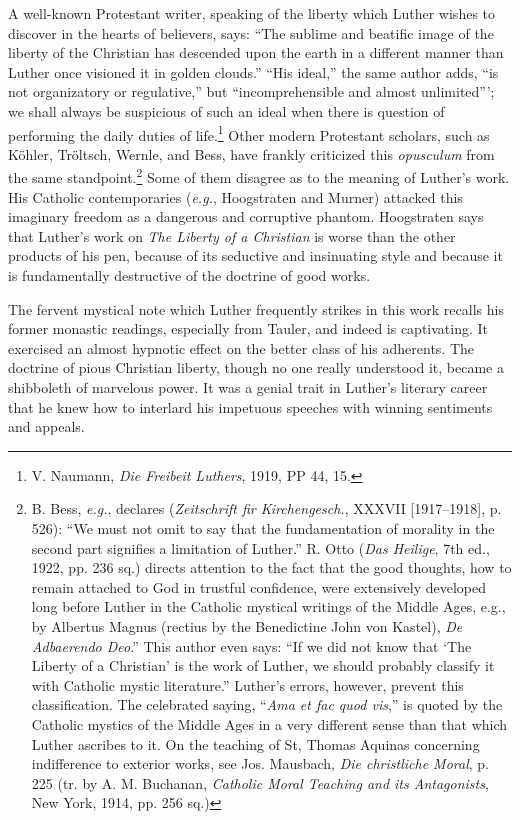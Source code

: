 A well-known Protestant writer, speaking of the liberty which
Luther wishes to discover in the hearts of believers, says: “The sublime
and beatific image of the liberty of the Christian has descended
upon the earth in a different manner than Luther once visioned it in
golden clouds.” “His ideal,” the same author adds, “is not organizatory
or regulative,” but “incomprehensible and almost unlimited”’;
we shall always be suspicious of such an ideal when there is question of
performing the daily duties of life.\footnote
{V. Naumann, \textit{Die Freibeit Luthers}, 1919, PP 44, 15.}
Other modern Protestant
scholars, such as Köhler, Tröltsch, Wernle, and Bess, have frankly
criticized this \textit{opusculum} from the same standpoint.\footnote
{B. Bess, \textit{e.g.}, declares (\textit{Zeitschrift fir Kirchengesch.}, XXXVII [1917--1918], p. 526):
“We must not omit to say that the fundamentation of morality in the second part signifies
a limitation of Luther.” R. Otto (\textit{Das Heilige}, 7th ed., 1922, pp. 236 sq.) directs
attention to the fact that the good thoughts, how to remain attached to God in trustful
confidence, were extensively developed long before Luther in the Catholic mystical writings
of the Middle Ages, e.g., by Albertus Magnus (rectius by the Benedictine John von Kastel),
\textit{De Adbaerendo Deo}.” This author even says: “If we did not know that ‘The Liberty of a
Christian’ is the work of Luther, we should probably classify it with Catholic mystic
literature.” Luther’s errors, however, prevent this classification. The celebrated saying,
“\textit{Ama et fac quod vis},” is quoted by the Catholic mystics of the Middle Ages in a very
different sense than that which Luther ascribes to it. On the teaching of St, Thomas
Aquinas concerning indifference to exterior works, see Jos. Mausbach, \textit{Die christliche Moral},
p. 225 (tr. by A. M. Buchanan, \textit{Catholic Moral Teaching and its Antagonists}, New York,
1914, pp. 256 sq.)}
Some of them disagree as to the meaning of Luther’s work. His Catholic contemporaries
(\textit{e.g.}, Hoogstraten and Murner) attacked this imaginary
freedom as a dangerous and corruptive phantom. Hoogstraten says
that Luther’s work on \textit{The Liberty of a Christian} is worse than the
other products of his pen, because of its seductive and insinuating
style and because it is fundamentally destructive of the doctrine of
good works.

The fervent mystical note which Luther frequently strikes in this
work recalls his former monastic readings, especially from Tauler,
and indeed is captivating. It exercised an almost hypnotic effect on
the better class of his adherents. The doctrine of pious Christian liberty,
though no one really understood it, became a shibboleth of marvelous
power. It was a genial trait in Luther’s literary career that he
knew how to interlard his impetuous speeches with winning sentiments
and appeals.

